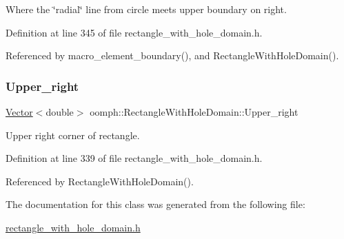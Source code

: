 Where the \char`\"{}radial\char`\"{} line from circle meets upper boundary on right. 



Definition at line 345 of file rectangle\+\_\+with\+\_\+hole\+\_\+domain.\+h.



Referenced by macro\+\_\+element\+\_\+boundary(), and Rectangle\+With\+Hole\+Domain().

\mbox{\label{classoomph_1_1RectangleWithHoleDomain_a3bc6d59a004c8fe1b634b43b6665c9b9}} 
\subsubsection{\texorpdfstring{Upper\+\_\+right}{Upper\_right}}
{\footnotesize\ttfamily \hyperlink{classoomph_1_1Vector}{Vector}$<$double$>$ oomph\+::\+Rectangle\+With\+Hole\+Domain\+::\+Upper\+\_\+right\hspace{0.3cm}{\ttfamily [private]}}



Upper right corner of rectangle. 



Definition at line 339 of file rectangle\+\_\+with\+\_\+hole\+\_\+domain.\+h.



Referenced by Rectangle\+With\+Hole\+Domain().



The documentation for this class was generated from the following file\+:\begin{DoxyCompactItemize}
\item 
\hyperlink{rectangle__with__hole__domain_8h}{rectangle\+\_\+with\+\_\+hole\+\_\+domain.\+h}\end{DoxyCompactItemize}
